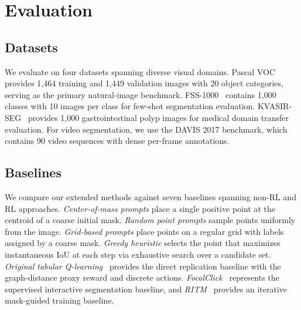 \documentclass[journal, onecolumn]{IEEEtran}
\begin{document}
\section{Evaluation}

\subsection{Datasets}

We evaluate on four datasets spanning diverse visual domains. Pascal VOC~\cite{Everingham2010VOC} provides 1,464 training and 1,449 validation images with 20 object categories, serving as the primary natural-image benchmark. FSS-1000~\cite{Li2020FSS1000} contains 1,000 classes with 10 images per class for few-shot segmentation evaluation. KVASIR-SEG~\cite{Jha2020KvasirSEG} provides 1,000 gastrointestinal polyp images for medical domain transfer evaluation. For video segmentation, we use the DAVIS 2017 benchmark, which contains 90 video sequences with dense per-frame annotations.

\subsection{Baselines}

We compare our extended methods against seven baselines spanning non-RL and RL approaches. \textit{Center-of-mass prompts} place a single positive point at the centroid of a coarse initial mask. \textit{Random point prompts} sample points uniformly from the image. \textit{Grid-based prompts} place points on a regular grid with labels assigned by a coarse mask. \textit{Greedy heuristic} selects the point that maximizes instantaneous IoU at each step via exhaustive search over a candidate set. \textit{Original tabular Q-learning}~\cite{Liu2025PlugAndPlayPPO} provides the direct replication baseline with the graph-distance proxy reward and discrete actions. \textit{FocalClick}~\cite{Chen2022FocalClick} represents the supervised interactive segmentation baseline, and \textit{RITM}~\cite{Sofiiuk2022RITM} provides an iterative mask-guided training baseline.
\end{document}
